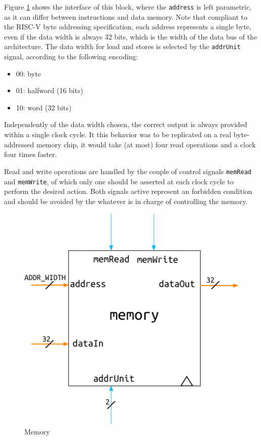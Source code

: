 \documentclass[a4paper]{article}
\begin{document}
Figure \ref{fig:memory} shows the interface of this block, where the \texttt{address} is left parametric, as it can differ between instructions and data memory. Note that compliant to the RISC-V byte addressing specification, each address represents a single byte, even if the data width is always 32 bits, which is the width of the data bus of the architecture. The data width for load and stores is selected by the \texttt{addrUnit} signal, according to the following encoding:
\begin{itemize}
    \item 00: byte
    \item 01: halfword (16 bits)
    \item 10: word (32 bits)
\end{itemize}
Independently of the data width chosen, the correct output is always provided within a single clock cycle. It this behavior was to be replicated on a real byte-addressed memory chip, it would take (at most) four read operations and a clock four times faster.

Read and write operations are handled by the couple of control signals \texttt{memRead} and \texttt{memWrite}, of which only one should be asserted at each clock cycle to perform the desired action. Both signals active represent an forbidden condition and should be avoided by the whatever is in charge of controlling the memory.

\begin{figure}[hbtp]
    \centering
    \includegraphics[scale=1]{../memory/ref/schematic/memory.pdf}
    \caption{Memory}
    \label{fig:memory}
\end{figure}
\end{document}
